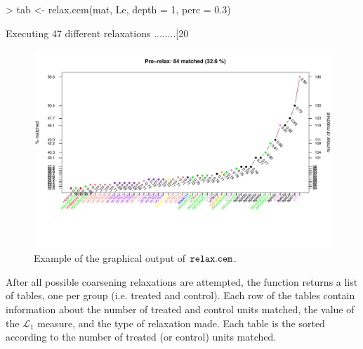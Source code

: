 \documentclass[article]{jss}
\begin{document}
\begin{Schunk}
\begin{Sinput}
> tab <- relax.cem(mat, Le, depth = 1, perc = 0.3)
\end{Sinput}
\begin{Soutput}
Executing 47 different relaxations
........[20%
\end{Soutput}
\end{Schunk}
\begin{figure}[Ht]
\begin{center}
\includegraphics[width=1.1\textwidth, viewport=0 60 700 400,clip]{coarsen1} 
\end{center}
\caption{Example of the graphical output of $\tt relax.cem$.}
\label{fig:coarsen}
\end{figure}

After all possible coarsening relaxations are attempted, the function
returns a list of tables, one per group (i.e. treated and control).
Each row of the tables contain information about the number of treated
and control units matched, the value of the $\mathcal L_1$ measure,
and the type of relaxation made.  Each table is the sorted according
to the number of treated (or control) units matched.
\end{document}
